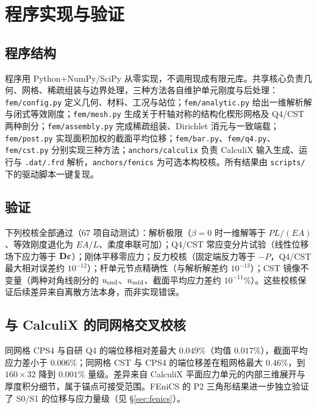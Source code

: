 \section{程序实现与验证}

\subsection{程序结构}

程序用 Python+NumPy/SciPy 从零实现，不调用现成有限元库。共享核心负责几何、网格、稀疏组装与边界处理，三种方法各自维护单元刚度与后处理：\texttt{fem/config.py} 定义几何、材料、工况与站位；\texttt{fem/analytic.py} 给出一维解析解与闭式等效刚度；\texttt{fem/mesh.py} 生成关于杆轴对称的结构化楔形网格及 Q4/CST 两种剖分；\texttt{fem/assembly.py} 完成稀疏组装、Dirichlet 消元与一致端载；\texttt{fem/post.py} 实现面积加权的截面平均位移；\texttt{fem/bar.py}、\texttt{fem/q4.py}、\texttt{fem/cst.py} 分别实现三种方法；\texttt{anchors/calculix} 负责 CalculiX 输入生成、运行与 \texttt{.dat/.frd} 解析，\texttt{anchors/fenics} 为可选本构校核。所有结果由 \texttt{scripts/} 下的驱动脚本一键复现。

\subsection{验证}

下列校核全部通过（67 项自动测试）：解析极限（$\beta=0$ 时一维解等于 $PL/(EA)$、等效刚度退化为 $EA/L$、柔度串联可加）；Q4/CST 常应变分片试验（线性位移场下应力等于 $\mathbf{D}\boldsymbol{\varepsilon}$）；刚体平移零应力；反力校核（固定端反力等于 $-P$，Q4/CST 最大相对误差约 $10^{-12}$）；杆单元节点精确性（与解析解差约 $10^{-13}$）；CST 镜像不变量（两种对角线剖分的 $u_{\rm end}$、$u_{\rm mid}$、截面平均应力差约 $10^{-11}\%$）。这些校核保证后续差异来自离散方法本身，而非实现错误。

\subsection{与 CalculiX 的同网格交叉校核}

同网格 CPS4 与自研 Q4 的端位移相对差最大 $0.049\%$（均值 $0.017\%$），截面平均应力差小于 $0.006\%$；同网格 CST 与 CPS4 的端位移差在粗网格最大 $0.46\%$，到 $160\times32$ 降到 $0.001\%$ 量级。差异来自 CalculiX 平面应力单元的内部三维展开与厚度积分细节，属于锚点可接受范围。FEniCS 的 P2 三角形结果进一步独立验证了 S0/S1 的位移与应力量级（见 \S\ref{sec:fenics}）。
